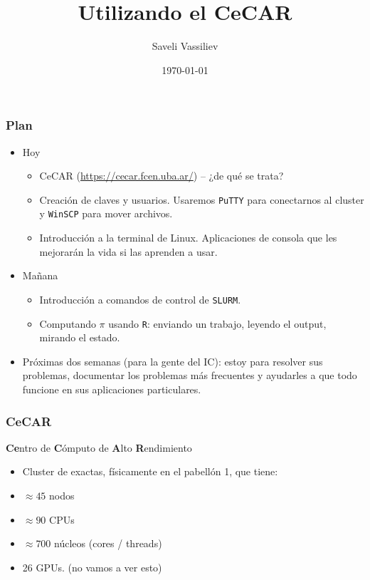 \documentclass[handout]{beamer}
\title[CeCAR]{Utilizando el CeCAR}
\author[Saveli Vassiliev]{Saveli Vassiliev}
\institute[UBA, FCEyN, IC]{Universidad de Buenos Aires \\ Facultad de Ciencias Exactas y Naturales, Instituto de Cálculo}
\date{\today}                    %
\begin{document}
\begin{frame}
  \titlepage
\end{frame}

%


\begin{frame}
\frametitle{Plan}
\begin{itemize}
  \item<+-> Hoy
  \begin{itemize}
    \item CeCAR (\url{https://cecar.fcen.uba.ar/}) -- ¿de qué se trata?
    \item Creación de claves y usuarios. Usaremos \Verb=PuTTY= para conectarnos al cluster y \Verb=WinSCP= para mover archivos.
    \item Introducción a la terminal de Linux. Aplicaciones de consola que les mejorarán la vida si las aprenden a usar.
  \end{itemize}
  \item<+-> Mañana
  \begin{itemize}
    \item Introducción a comandos de control de \Verb=SLURM=.
    \item Computando $\pi$ usando \Verb=R=: enviando un trabajo, leyendo el output, mirando el estado.
  \end{itemize}
  \item<+-> Próximas dos semanas (para la gente del IC): estoy para resolver sus problemas, documentar los problemas más frecuentes y ayudarles a que todo funcione en sus aplicaciones particulares.
\end{itemize}
\end{frame}

\begin{frame}
\frametitle{CeCAR}
\textbf{Ce}ntro de \textbf{C}ómputo de \textbf{A}lto \textbf{R}endimiento

\begin{itemize}
  \item<+-> Cluster de exactas, físicamente en el pabellón 1, que tiene:
  \item<+-> $\approx 45$ nodos
  \item<+-> $\approx 90$ CPUs
  \item<+-> $\approx 700$ núcleos (cores / threads)
  \item<+-> 26 GPUs. (no vamos a ver esto)
\end{itemize}
\end{frame}
\end{document}
